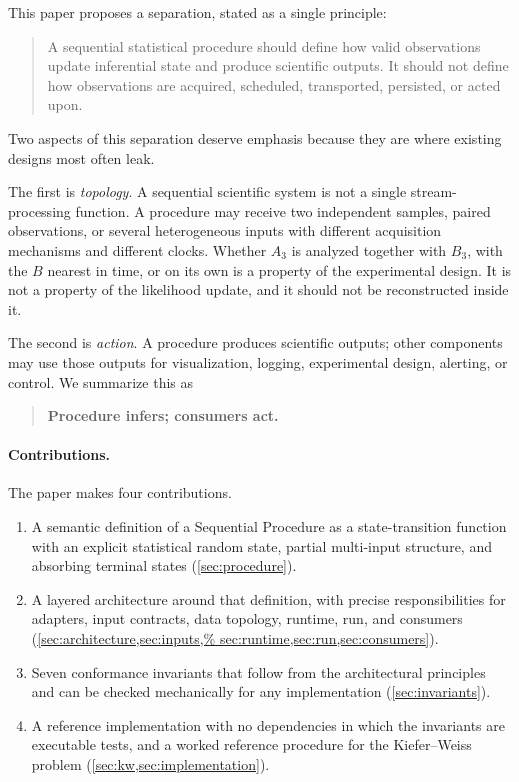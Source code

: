 \documentclass[11pt,a4paper]{article}
\theoremstyle{definition}
\theoremstyle{remark}
\begin{document}
This paper proposes a separation, stated as a single principle:

\begin{quote}
A sequential statistical procedure should define how valid observations
update inferential state and produce scientific outputs. It should not
define how observations are acquired, scheduled, transported, persisted,
or acted upon.
\end{quote}

Two aspects of this separation deserve emphasis because they are where
existing designs most often leak.

The first is \emph{topology}. A sequential scientific system is not a
single stream-processing function. A procedure may receive two
independent samples, paired observations, or several heterogeneous
inputs with different acquisition mechanisms and different clocks.
Whether $A_3$ is analyzed together with $B_3$, with the $B$ nearest in
time, or on its own is a property of the experimental design. It is not
a property of the likelihood update, and it should not be reconstructed
inside it.

The second is \emph{action}. A procedure produces scientific outputs;
other components may use those outputs for visualization, logging,
experimental design, alerting, or control. We summarize this as

\begin{quote}
\textbf{Procedure infers; consumers act.}
\end{quote}

\paragraph{Contributions.}
The paper makes four contributions.
\begin{enumerate}[label=(\roman*),nosep]
    \item A semantic definition of a Sequential Procedure as a
    state-transition function with an explicit statistical random state,
    partial multi-input structure, and absorbing terminal states
    (\cref{sec:procedure}).
    \item A layered architecture around that definition, with precise
    responsibilities for adapters, input contracts, data topology,
    runtime, run, and consumers (\cref{sec:architecture,sec:inputs,%
    sec:runtime,sec:run,sec:consumers}).
    \item Seven conformance invariants that follow from the
    architectural principles and can be checked mechanically for any
    implementation (\cref{sec:invariants}).
    \item A reference implementation with no dependencies in which the
    invariants are executable tests, and a worked reference procedure
    for the Kiefer--Weiss problem
    (\cref{sec:kw,sec:implementation}).
\end{enumerate}
\end{document}
